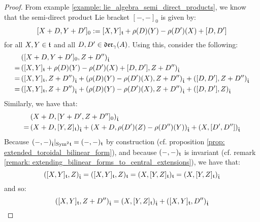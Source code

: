 \begin{proof}
                From example \ref{example: lie_algebra_semi_direct_products}, we know that the semi-direct product Lie bracket $[-, -]_0$ is given by:
                    $$[X + D, Y + D']_0 := [X, Y]_{\mathfrak{t}} + \rho(D)(Y) - \rho(D')(X) + [D, D']$$
                for all $X, Y \in \mathfrak{t}$ and all $D, D' \in \mathfrak{der}_{\gamma}(A)$. Using this, consider the following:
                    $$
                        \begin{aligned}
                            & \left( [X + D, Y + D']_0, Z + D'' \right)_{\hat{\mathfrak{t}}}
                            \\
                            = & \left( [X, Y]_{\mathfrak{t}} + \rho(D)(Y) - \rho(D')(X) + [D, D'], Z + D'' \right)_{\hat{\mathfrak{t}}}
                            \\
                            = & \left( [X, Y]_{\mathfrak{t}}, Z + D'' \right)_{\hat{\mathfrak{t}}} + \left(\rho(D)(Y) - \rho(D')(X), Z + D'' \right)_{\hat{\mathfrak{t}}} + \left( [D, D'], Z + D'' \right)_{\hat{\mathfrak{t}}}
                            \\
                            = & \left( [X, Y]_{\mathfrak{t}}, Z + D'' \right)_{\hat{\mathfrak{t}}} + \left(\rho(D)(Y) - \rho(D')(X), Z + D'' \right)_{\hat{\mathfrak{t}}} + \left( [D, D'], Z \right)_{\hat{\mathfrak{t}}}
                        \end{aligned}
                    $$
                Similarly, we have that:
                    $$
                        \begin{aligned}
                            & \left( X + D, [Y + D', Z + D'']_0 \right)_{\hat{\mathfrak{t}}}
                            \\
                            = & \left( X + D, [Y, Z]_{\mathfrak{t}} \right)_{\hat{\mathfrak{t}}} + \left( X + D, \rho(D')(Z) - \rho(D'')(Y) \right)_{\hat{\mathfrak{t}}} + \left(X, [D', D'']\right)_{\hat{\mathfrak{t}}}
                        \end{aligned}
                    $$
                Because $(-, -)_{\hat{\mathfrak{t}}}|_{\mathrm{Sym}^2 \mathfrak{t}} = (-, -)_{\mathfrak{t}}$ by construction (cf. proposition \ref{prop: extended_toroidal_bilinear_form}), and because $(-, -)_{\mathfrak{t}}$ is invariant (cf. remark \ref{remark: extending_bilinear_forms_to_central_extensions}), we have that:
                    $$([X, Y]_{\mathfrak{t}}, Z)_{\hat{\mathfrak{t}}} = ([X, Y]_{\mathfrak{t}}, Z)_{\mathfrak{t}} = (X, [Y, Z]_{\mathfrak{t}})_{\mathfrak{t}} = (X, [Y, Z]_{\mathfrak{t}})_{\hat{\mathfrak{t}}}$$
                and so:
                    $$( [X, Y]_{\mathfrak{t}}, Z + D'' )_{\hat{\mathfrak{t}}} = (X, [Y, Z]_{\mathfrak{t}})_{\hat{\mathfrak{t}}} + ( [X, Y]_{\mathfrak{t}}, D'')_{\hat{\mathfrak{t}}}$$

\end{proof}

